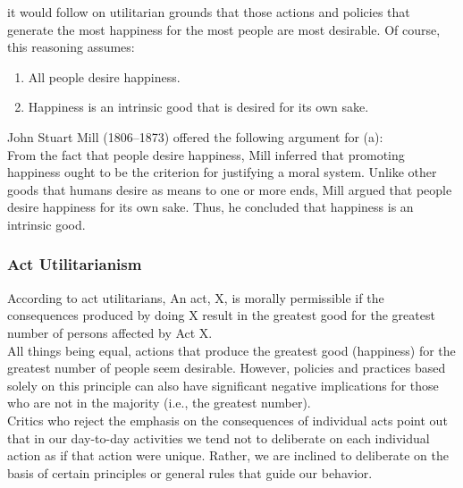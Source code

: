 \documentclass[12pt]{article}
\theoremstyle{definition}
\begin{document}
it would follow on utilitarian grounds that those actions and policies that generate the
most happiness for the most people are most desirable. Of course, this reasoning assumes:
\begin{enumerate}
\item All people desire happiness.
\item Happiness is an intrinsic good that is desired for its own sake.
\end{enumerate}
John Stuart Mill (1806–1873) offered the following argument for (a):\\
From the fact that people desire happiness, Mill inferred that promoting happiness
ought to be the criterion for justifying a moral system. Unlike other goods that humans
desire as means to one or more ends, Mill argued that people desire happiness for its own
sake. Thus, he concluded that happiness is an intrinsic good.\\
\subsubsection{Act Utilitarianism}
According to act utilitarians, An act, X, is morally permissible if the consequences produced by doing X result in the greatest good for the greatest number of persons affected by Act X.\\
All things being equal, actions that produce the greatest good (happiness) for the
greatest number of people seem desirable. However, policies and practices based solely
on this principle can also have significant negative implications for those who are not in
the majority (i.e., the greatest number).\\
Critics who reject the emphasis on the consequences of individual acts point out that
in our day-to-day activities we tend not to deliberate on each individual action as if that
action were unique. Rather, we are inclined to deliberate on the basis of certain principles
or general rules that guide our behavior.
\end{document}
